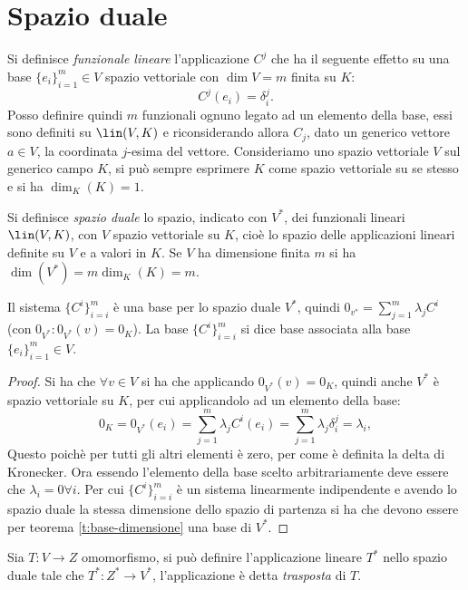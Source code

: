 \section{Spazio duale}
Si definisce \emph{funzionale lineare} l'applicazione $C^j$ che ha il seguente effetto su una base $\{e_i\}_{i=1}^m\in V$ spazio vettoriale con $\dim V = m$ finita su $K$:
\begin{equation*}
	C^j(e_i) = \delta_i^j.
\end{equation*}
Posso definire quindi $m$ funzionali ognuno legato ad un elemento della base, essi sono definiti su $\lin (V,K)$ e riconsiderando allora $C_j$, dato un generico vettore $  a \in V$, la coordinata $j$-esima del vettore.
Consideriamo uno spazio vettoriale $V$ sul generico campo $K$, si può sempre esprimere $K$ come spazio vettoriale su se stesso e si ha $\dim_K(K) = 1$.
\begin{definizione} \label{d:spazio-duale}
	Si definisce \emph{spazio duale} lo spazio, indicato con $V^*$, dei funzionali lineari $\lin(V,K)$, con $V$ spazio vettoriale su $K$, cioè lo spazio delle applicazioni lineari definite su $V$ e a valori in $K$.
	Se  $V$ ha dimensione finita $m$ si ha $\dim(V^*) = m \dim_K(K) = m$.
\end{definizione}
\begin{teorema} \label{t:base-associata}
	Il sistema $\{C^i\}_{i=i}^m$ è una base per lo spazio duale $V^*$, quindi $0_{v^*} = \sum_{j=1}^m\lambda_jC^i$ (con $0_{V^*}\colon 0_{V^*}(  v) = 0_K$).
	La base $\{C^i\}_{i=i}^m$ si dice base associata alla base $\{e_i\}_{i=1}^m\in V$.
\end{teorema}
\begin{proof}
	Si ha che $\forall   v\in V$ si ha che applicando $0_{V^*}(  v) = 0_K$, quindi anche $V^*$ è spazio vettoriale su $K$, per cui applicandolo ad un elemento della base:
	\begin{equation*}
	0_K = 0_{V^*}(e_i) = \sum_{j=1}^m\lambda_jC^i(e_i) =  \sum_{j=1}^m\lambda_j\delta_i^j = \lambda_i,
	\end{equation*}
	Questo poichè per tutti gli altri elementi è zero, per come è definita la delta di Kronecker.
	Ora essendo l'elemento della base scelto arbitrariamente deve essere che $\lambda_i =0 \forall i$.
	Per cui $\{C^i\}_{i=i}^m$ è un sistema linearmente indipendente e avendo lo spazio duale la stessa dimensione dello spazio di partenza si ha che devono essere per teorema \ref{t:base-dimensione} una base di $V^*$. 
\end{proof}
\begin{definizione} \label{d:applicazione-trasposta}
	Sia $T\colon V\to Z$ omomorfismo, si può definire l'applicazione lineare $T^*$ nello spazio duale tale che $T^*\colon Z^*\to V^*$, l'applicazione è detta \emph{trasposta} di $T$.
\end{definizione}
